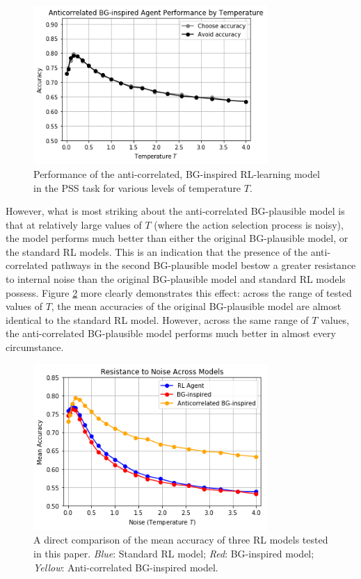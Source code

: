 \documentclass[10pt,letterpaper]{article}
\begin{document}
\begin{figure}[ht]
	\begin{center}
		\includegraphics[width=3.5in]{bg-anti-agent-performance.png}
	\end{center}
	\caption{Performance of the anti-correlated, BG-inspired RL-learning model in the PSS task for various levels of temperature $T$.}
	\label{bg-anti-agent}
\end{figure}

However, what is most striking about the anti-correlated BG-plausible model is that at relatively large values of $T$ (where the action selection process is noisy), the model performs much better than either the original BG-plausible model, or the standard RL models. This is an indication that the presence of the anti-correlated pathways in the second BG-plausible model bestow a greater resistance to internal noise than the original BG-plausible model and standard RL models possess. Figure \ref{resistance-to-noise} more clearly demonstrates this effect: across the range of tested values of $T$, the mean accuracies of the original BG-plausible model are almost identical to the standard RL model. However, across the same range of $T$ values, the anti-correlated BG-plausible model performs much better in almost every circumstance.

\begin{figure}[ht]
	\begin{center}
		\includegraphics[width=3.5in]{resistance-to-noise.png}
	\end{center}
	\caption{A direct comparison of the mean accuracy of three RL models tested in this paper. \emph{Blue}: Standard RL model; \emph{Red}: BG-inspired model; \emph{Yellow}: Anti-correlated BG-inspired model.} 
	\label{resistance-to-noise}
\end{figure}
\end{document}
